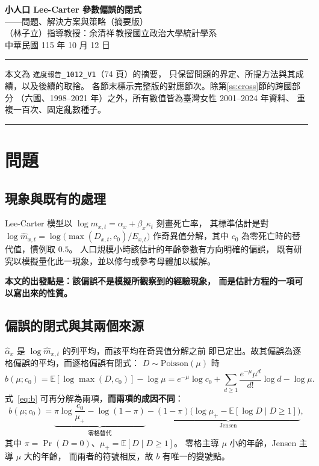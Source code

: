 \documentclass[UTF8, fontset=macnew, a4paper, 12pt]{ctexart}
\newcommand{\Ex}{\mathbb{E}}
\begin{document}

\begin{center}
{\bfseries 小人口 Lee-Carter 參數偏誤的閉式}\\[4pt]
{ ——問題、解決方案與策略（摘要版）}\\[8pt]
{ （林子立）\quad 指導教授：余清祥\,教授\quad 國立政治大學統計學系}\\[4pt]
{ 中華民國 115 年 10 月 12 日}
\end{center}

\vspace{4pt}
\noindent\rule{\textwidth}{0.8pt}
\vspace{2pt}

\noindent 本文為 \texttt{進度報告\_1012\_V1}（74 頁）的摘要，
只保留問題的界定、所提方法與其成績，以及後續的取捨。
各節末標示完整版的對應節次。除第\ref{ss:cross}節的跨國部分
（六國、1998--2021 年）之外，所有數值皆為臺灣女性 2001--2024 年資料、
重複一百次、固定亂數種子。

\vspace{2pt}
\noindent\rule{\textwidth}{0.8pt}

\section{問題}\label{s:prob}

\subsection{現象與既有的處理}

Lee-Carter 模型以 $\log m_{x,t}=\alpha_x+\beta_x\kappa_t$ 刻畫死亡率，
其標準估計是對 $\log\hat m_{x,t}=\log\big(\max(D_{x,t},c_0)/E_{x,t}\big)$
作奇異值分解，其中 $c_0$ 為零死亡時的替代值，慣例取 $0.5$。
人口規模小時該估計的年齡參數有方向明確的偏誤，
既有研究以模擬量化此一現象，並以修勻或參考母體加以緩解。

\textbf{本文的出發點是：該偏誤不是模擬所觀察到的經驗現象，
而是估計方程的一項可以寫出來的性質。}

\subsection{偏誤的閉式與其兩個來源}

$\hat\alpha_x$ 是 $\log\hat m_{x,t}$ 的列平均，而該平均在奇異值分解之前
即已定出。故其偏誤為逐格偏誤的平均，而逐格偏誤有閉式：
$D\sim\text{Poisson}(\mu)$ 時
\begin{equation}\label{eq:b}
b(\mu;c_0)=\Ex[\log\max(D,c_0)]-\log\mu
= e^{-\mu}\log c_0+\sum_{d\ge1}\frac{e^{-\mu}\mu^{d}}{d!}\log d-\log\mu .
\end{equation}
式~\eqref{eq:b} 可再分解為兩項，\textbf{而兩項的成因不同}：
$$b(\mu;c_0)=\underbrace{\pi\log\frac{c_0}{\mu_+}-\log(1-\pi)}_{\text{零格替代}}
-\underbrace{(1-\pi)\big(\log\mu_+-\Ex[\log D\mid D\ge1]\big)}_{\text{Jensen}},$$
其中 $\pi=\Pr(D=0)$、$\mu_+=\Ex[D\mid D\ge1]$。
零格主導 $\mu$ 小的年齡，Jensen 主導 $\mu$ 大的年齡，
而兩者的符號相反，故 $b$ 有唯一的變號點。
\end{document}
